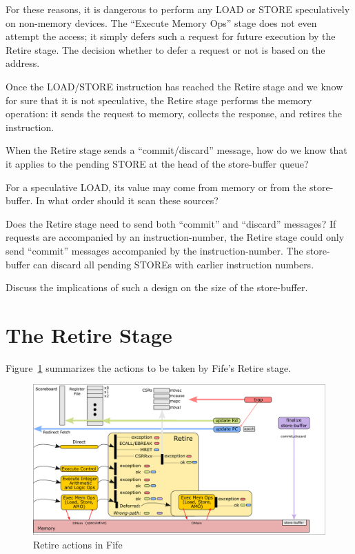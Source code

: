 For these reasons, it is dangerous to perform any LOAD or STORE
speculatively on non-memory devices.  The ``Execute Memory Ops'' stage
does not even attempt the access; it simply defers such a request for
future execution by the Retire stage.  The decision whether to defer a
request or not is based on the address.

Once the LOAD/STORE instruction has reached the Retire stage and we
know for sure that it is not speculative, the Retire stage performs
the memory operation: it sends the request to memory, collects the
response, and retires the instruction.


\hdivider

\Exercise

When the Retire stage sends a ``commit/discard'' message, how do we
know that it applies to the pending STORE at the head of the
store-buffer queue?

\Exercise

For a speculative LOAD, its value may come from memory or from the
store-buffer.  In what order should it scan these sources?

\Exercise

Does the Retire stage need to send both ``commit'' and ``discard''
messages?  If requests are accompanied by an instruction-number, the
Retire stage could only send ``commit'' messages accompanied by the
instruction-number.  The store-buffer can discard all pending STOREs
with earlier instruction numbers.

Discuss the implications of such a design on the size of the store-buffer.

\Endexercise


\section{The Retire Stage}

\label{Sec_Fife_Retire_Principles}

Figure~\ref{Fig_Fife_Retire} summarizes the actions to be taken by
Fife's Retire stage.

\begin{figure}[htbp]
  \centerline{\includegraphics[width=6in,angle=0]{Figures/Fig_Retire_Layers_1_2}}
  \caption{\label{Fig_Fife_Retire}Retire actions in Fife}
\end{figure}

